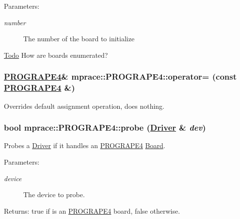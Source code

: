 \begin{Desc}
\item[Parameters:]
\begin{description}
\item[{\em number}]The number of the board to initialize \end{description}
\end{Desc}
\begin{Desc}
\item[\hyperlink{todo__todo000004}{Todo}]How are boards enumerated? \end{Desc}
\hypertarget{classmprace_1_1PROGRAPE4_b1}{
\subsubsection[operator=]{\setlength{\rightskip}{0pt plus 5cm}\hyperlink{classmprace_1_1PROGRAPE4}{PROGRAPE4}\& mprace::PROGRAPE4::operator= (const \hyperlink{classmprace_1_1PROGRAPE4}{PROGRAPE4} \&)}}
\label{classmprace_1_1PROGRAPE4_b1}


Overrides default assignment operation, does nothing. 

\hypertarget{classmprace_1_1PROGRAPE4_e0}{
\subsubsection[probe]{\setlength{\rightskip}{0pt plus 5cm}bool mprace::PROGRAPE4::probe (\hyperlink{classmprace_1_1Driver}{Driver} \& {\em dev})}}
\label{classmprace_1_1PROGRAPE4_e0}


Probes a \hyperlink{classmprace_1_1Driver}{Driver} if it handles an \hyperlink{classmprace_1_1PROGRAPE4}{PROGRAPE4} \hyperlink{classmprace_1_1Board}{Board}. 

\begin{Desc}
\item[Parameters:]
\begin{description}
\item[{\em device}]The device to probe. \end{description}
\end{Desc}
\begin{Desc}
\item[Returns:]true if is an \hyperlink{classmprace_1_1PROGRAPE4}{PROGRAPE4} board, false otherwise.\end{Desc}


